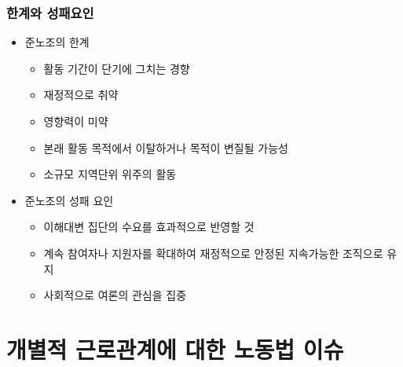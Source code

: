 \documentclass[aspectratio=169,xcolor=dvipsnames,handout]{beamer}
\begin{document}
\begin{frame}
    \frametitle{한계와 성패요인}
    \begin{itemize}[<+->]
        \item 준노조의 한계
        \begin{itemize}
            \item 활동 기간이 단기에 그치는 경향
            \item 재정적으로 취약
            \item 영향력이 미약
            \item 본래 활동 목적에서 이탈하거나 목적이 변질될 가능성
            \item 소규모 지역단위 위주의 활동
        \end{itemize}
        \item 준노조의 성패 요인
        \begin{itemize}
            \item 이해대변 집단의 수요를 효과적으로 반영할 것 
            \item 계속 참여자나 지원자를 확대하여 재정적으로 안정된 지속가능한 조직으로 유지
            \item 사회적으로 여론의 관심을 집중
        \end{itemize}
    \end{itemize}
\end{frame}

\section{개별적 근로관계에 대한 노동법 이슈}
\end{document}
